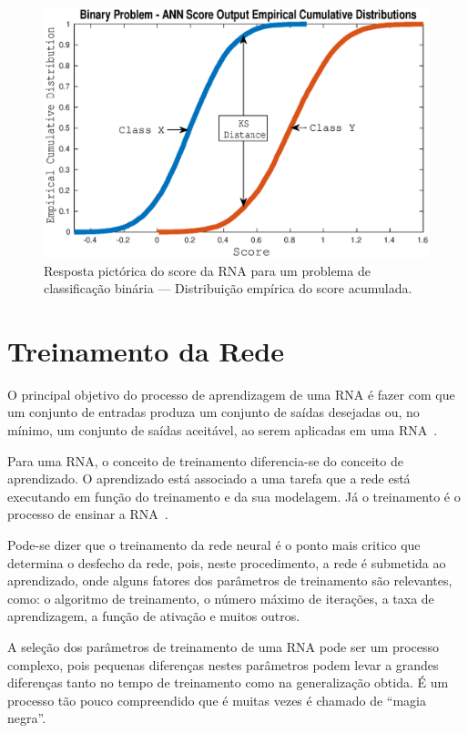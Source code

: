 \begin{figure}[H]
\centering
\includegraphics[width=1\textwidth]{figuras/ANNScore_Output_Cumulative.eps}
\caption{Resposta pictórica do score da RNA para um problema de classificação binária --- Distribuição empírica do score acumulada.}
\label{fig:ANN_Distribution_b}
\end{figure}

\section{Treinamento da Rede}

O principal objetivo do processo de aprendizagem de uma RNA é fazer com que um conjunto de entradas produza um conjunto de saídas desejadas ou, no mínimo, um conjunto de saídas aceitável, ao serem aplicadas em uma RNA~\cite{haykin2007redes}.

Para uma RNA, o conceito de treinamento diferencia-se do conceito de aprendizado. O aprendizado está associado a uma tarefa que a rede está executando em função do treinamento e da sua modelagem. Já o treinamento é o processo de ensinar a RNA~\cite{furtado2019redes}.

Pode-se dizer que o treinamento da rede neural é o ponto mais critico que determina o desfecho da rede, pois, neste procedimento, a rede é submetida ao aprendizado, onde alguns fatores dos parâmetros de treinamento são relevantes, como: o algoritmo de treinamento, o número máximo de iterações, a taxa de aprendizagem, a função de ativação e muitos outros.

A seleção dos parâmetros de treinamento de uma RNA pode ser um processo complexo, pois pequenas diferenças nestes parâmetros podem levar a grandes diferenças tanto no tempo de treinamento como na generalização obtida. É um processo tão pouco compreendido que é muitas vezes é chamado de “magia negra”.

